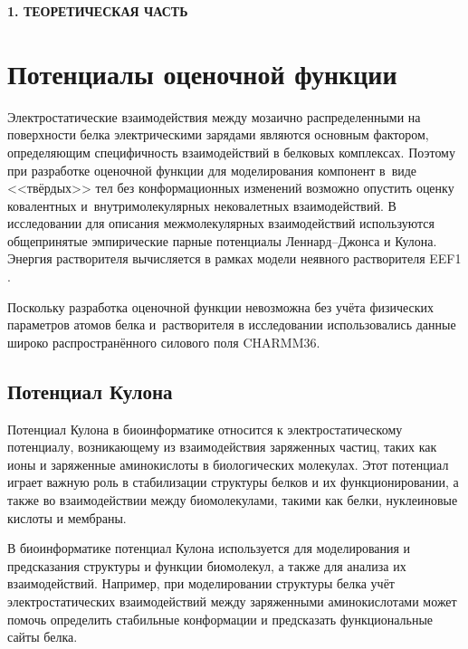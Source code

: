 \newpage
\begin{center}
  \textbf{\large 1. ТЕОРЕТИЧЕСКАЯ ЧАСТЬ}
\end{center}


\section{Потенциалы оценочной функции}

Электростатические взаимодействия между мозаично распределенными на поверхности белка электрическими зарядами являются основным фактором, определяющим специфичность взаимодействий в белковых комплексах\cite{chrushev}. Поэтому при разработке оценочной функции для моделирования компонент в~виде <<твёрдых>> тел без конформационных изменений возможно опустить оценку ковалентных и~внутримолекулярных нековалетных взаимодействий. В исследовании для описания межмолекулярных взаимодействий используются общепринятые эмпирические парные потенциалы Леннард--Джонса и Кулона. Энергия растворителя вычисляется в рамках модели неявного растворителя EEF1 \cite{eef1}.

Поскольку разработка оценочной функции невозможна без учёта физических параметров атомов белка и~растворителя в исследовании использовались данные широко распространённого силового поля CHARMM36\cite{brooks}.


\subsection{Потенциал Кулона}


Потенциал Кулона в биоинформатике относится к электростатическому потенциалу, возникающему из взаимодействия заряженных частиц, таких как ионы и заряженные аминокислоты в биологических молекулах. Этот потенциал играет важную роль в стабилизации структуры белков и их функционировании, а также во взаимодействии между биомолекулами, такими как белки, нуклеиновые кислоты и мембраны.

В биоинформатике потенциал Кулона используется для моделирования и предсказания структуры и функции биомолекул, а также для анализа их взаимодействий. Например, при моделировании структуры белка учёт электростатических взаимодействий между заряженными аминокислотами может помочь определить стабильные конформации и предсказать функциональные сайты белка.

